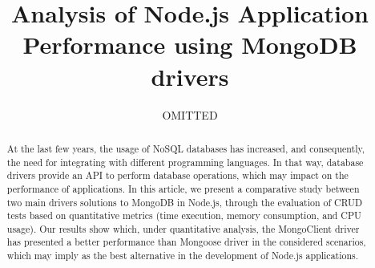 \documentclass{svproc}
\begin{document}
\mainmatter              %
%
\title{Analysis of Node.js Application Performance using MongoDB drivers}
%
%
\author{OMITTED}
%
%
%

\maketitle %

\begin{abstract}
At the last few years, the usage of NoSQL databases has increased, and consequently, the need for integrating with different programming languages. In that way, database drivers provide an API to perform database operations, which may impact on the performance of applications. In this article, we present a comparative study between two main drivers solutions to MongoDB in Node.js, through the evaluation of CRUD tests based on quantitative metrics (time execution, memory consumption, and CPU usage). Our results show which, under quantitative analysis, the MongoClient driver has presented a better performance than Mongoose driver in the considered scenarios, which may imply as the best alternative in the development of Node.js applications.
\end{abstract}
%
\end{document}
